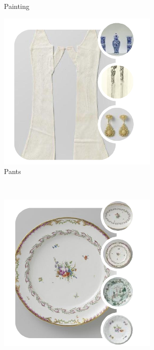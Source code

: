\documentclass[runningheads]{llncs}
\begin{document}
\begin{figure}
\begin{subfigure}[b]{0.3\textwidth}
		\caption{Painting}
		\label{fig:painting}
	\end{subfigure}
	\begin{subfigure}[b]{0.3\textwidth}
		\includegraphics[width=\textwidth]{figures/data_supervisor/pants}
		\caption{Pants}
		\label{fig:pants}
	\end{subfigure}
	~ %
	\begin{subfigure}[b]{0.3\textwidth}
		\includegraphics[width=\textwidth]{figures/data_supervisor/plate}

\end{subfigure}
\end{figure}
\end{document}
